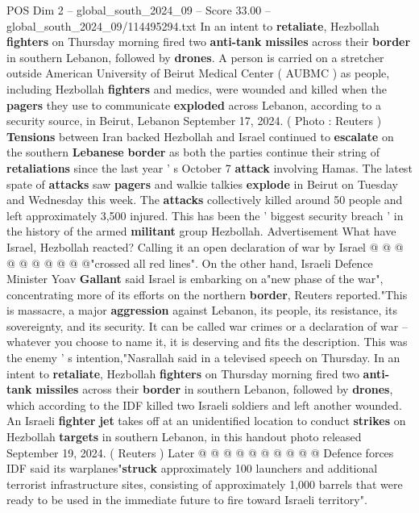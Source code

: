 \begin{textsample}{POS Dim 2 – global\_south\_2024\_09 – Score 33.00 – global\_south\_2024\_09/114495294.txt}  \label{ex:f2_pos_032}
In an intent to \textbf{retaliate}, Hezbollah \textbf{fighters} on Thursday morning fired two \textbf{anti-tank} \textbf{missiles} across their \textbf{border} in southern Lebanon, followed by \textbf{drones}.
A person is carried on a stretcher outside American University of Beirut Medical Center ( AUBMC ) as people, including Hezbollah \textbf{fighters} and medics, were wounded and killed when the \textbf{pagers} they use to communicate \textbf{exploded} across Lebanon, according to a security source, in Beirut, Lebanon September 17, 2024. ( Photo : Reuters ) \textbf{Tensions} between Iran backed Hezbollah and Israel continued to \textbf{escalate} on the southern \textbf{Lebanese} \textbf{border} as both the parties continue their string of \textbf{retaliations} since the last year ' s October 7 \textbf{attack} involving Hamas.
The latest spate of \textbf{attacks} saw \textbf{pagers} and walkie talkies \textbf{explode} in Beirut on Tuesday and Wednesday this week.
The \textbf{attacks} collectively killed around 50 people and left approximately 3,500 injured.
This has been the ' biggest security breach ' in the history of the armed \textbf{militant} group Hezbollah.
Advertisement What have Israel, Hezbollah reacted?
Calling it an open declaration of war by Israel @ @ @ @ @ @ @ @ @ @"crossed all red lines".
On the other hand, Israeli Defence Minister Yoav \textbf{Gallant} said Israel is embarking on a"new phase of the war", concentrating more of its efforts on the northern \textbf{border}, Reuters reported."This is massacre, a major \textbf{aggression} against Lebanon, its people, its resistance, its sovereignty, and its security.
It can be called war crimes or a declaration of war -- whatever you choose to name it, it is deserving and fits the description.
This was the enemy ' s intention,"Nasrallah said in a televised speech on Thursday.
In an intent to \textbf{retaliate}, Hezbollah \textbf{fighters} on Thursday morning fired two \textbf{anti-tank} \textbf{missiles} across their \textbf{border} in southern Lebanon, followed by \textbf{drones}, which according to the IDF killed two Israeli soldiers and left another wounded.
An Israeli \textbf{fighter} \textbf{jet} takes off at an unidentified location to conduct \textbf{strikes} on Hezbollah \textbf{targets} in southern Lebanon, in this handout photo released September 19, 2024. ( Reuters ) Later @ @ @ @ @ @ @ @ @ @ Defence forces IDF said its warplanes"\textbf{struck} approximately 100 launchers and additional terrorist infrastructure sites, consisting of approximately 1,000 barrels that were ready to be used in the immediate future to fire toward Israeli territory".

\end{textsample}
